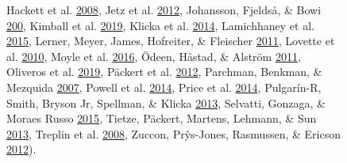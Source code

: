 \documentclass[
  english,
  man]{apa6}
\begin{document}
\begin{figure}[!h]
{Hackett et al. \protect\hyperlink{ref-hackett2008phylogenomic}{2008},
Jetz et al. \protect\hyperlink{ref-Jetz2012}{2012},
Johansson, Fjeldså, \& Bowi \protect\hyperlink{ref-johansson2008phylogenetic}{200},
Kimball et al. \protect\hyperlink{ref-kimball2019phylogenomic}{2019},
Klicka et al. \protect\hyperlink{ref-klicka2014comprehensive}{2014},
Lamichhaney et al. \protect\hyperlink{ref-lamichhaney2015evolution}{2015},
Lerner, Meyer, James, Hofreiter, \& Fleischer \protect\hyperlink{ref-lerner2011multilocus}{2011},
Lovette et al. \protect\hyperlink{ref-lovette2010comprehensive}{2010},
Moyle et al. \protect\hyperlink{ref-moyle2016tectonic}{2016},
Ödeen, Håstad, \& Alström \protect\hyperlink{ref-odeen2011evolution}{2011},
Oliveros et al. \protect\hyperlink{ref-oliveros2019earth}{2019},
Päckert et al. \protect\hyperlink{ref-packert2012horizontal}{2012},
Parchman, Benkman, \& Mezquida \protect\hyperlink{ref-parchman2007coevolution}{2007},
Powell et al. \protect\hyperlink{ref-powell2014comprehensive}{2014},
Price et al. \protect\hyperlink{ref-price2014niche}{2014},
Pulgarín-R, Smith, Bryson Jr, Spellman, \& Klicka \protect\hyperlink{ref-pulgarin2013multilocus}{2013},
Selvatti, Gonzaga, \& Moraes Russo \protect\hyperlink{ref-selvatti2015paleogene}{2015},
Tietze, Päckert, Martens, Lehmann, \& Sun \protect\hyperlink{ref-tietze2013complete}{2013},
Treplin et al. \protect\hyperlink{ref-treplin2008molecular}{2008},
Zuccon, Prŷs-Jones, Rasmussen, \& Ericson \protect\hyperlink{ref-zuccon2012phylogenetic}{2012}).
}
\label{fig:fringillidae-topologies}
\end{figure}
\end{document}

